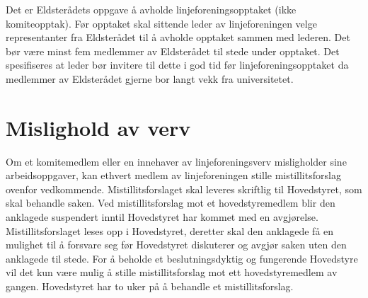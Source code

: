  {
Det er Eldsterådets oppgave å avholde linjeforeningsopptaket (ikke komiteopptak). Før opptaket skal
sittende leder av linjeforeningen \linebreak velge representanter fra Eldsterådet til å avholde opptaket sammen med lederen. Det bør være minst fem medlemmer av Eldsterådet til stede \linebreak under opptaket. Det spesifiseres at leder bør invitere til dette i god tid før linjeforeningsopptaket da medlemmer av Eldsterådet gjerne bor langt vekk fra universitetet.
}

\section{Mislighold av verv}
Om et komitemedlem eller en innehaver av linjeforeningsverv misligholder sine arbeidsoppgaver, kan ethvert medlem av linjeforeningen stille mistillitsforslag ovenfor vedkommende. Mistillitsforslaget skal leveres skriftlig til Hovedstyret, som skal behandle saken. Ved mistillitsforslag mot et hovedstyremedlem blir den anklagede suspendert inntil Hovedstyret har kommet med en avgjørelse. Mistillitsforslaget leses opp i Hovedstyret, deretter skal den anklagede få en mulighet til å forsvare seg før Hovedstyret diskuterer og avgjør saken uten den anklagede til stede. For å beholde et beslutningsdyktig og fungerende Hovedstyre vil det kun være mulig å stille mistillitsforslag mot ett hovedstyremedlem av gangen. Hovedstyret har to uker på å behandle et mistillitsforslag.

\newpage